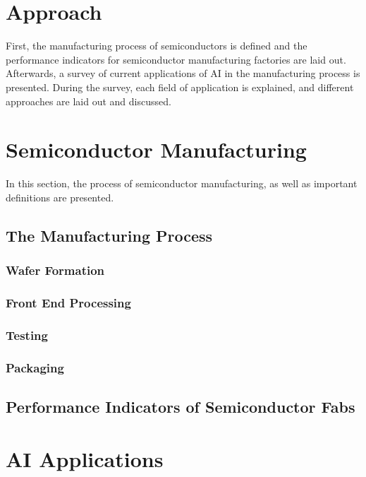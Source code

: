 \documentclass{Academic}
\begin{document}
    \section{Approach}
    First, the manufacturing process of semiconductors is defined and the performance indicators for semiconductor manufacturing factories are laid out. Afterwards, a survey of current applications of AI in the manufacturing process is presented. During the survey, each field of application is explained, and different approaches are laid out and discussed.

    \section{Semiconductor Manufacturing}
    In this section, the process of semiconductor manufacturing, as well as important definitions are presented.

    \subsection{The Manufacturing Process}

    \subsubsection{Wafer Formation}

    \subsubsection{Front End Processing}

    \subsubsection{Testing}

    \subsubsection{Packaging}

    \subsection{Performance Indicators of Semiconductor Fabs}

    \section{AI Applications}
\end{document}
